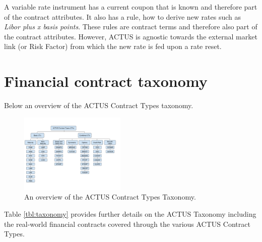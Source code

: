 \documentclass[9pt,oneside]{amsart}
\begin{document}
\begin{multicols}{2}
A variable rate instrument has a current coupon that is known and therefore part of the contract attributes. It also has a rule, how to derive new rates such as \textit{Libor plus x basis points}. These rules are contract terms and therefore also part of the contract attributes. However, ACTUS is agnostic towards the external market link (or Risk Factor) from which the new rate is fed upon a rate reset.



\section{Financial contract taxonomy}

Below an overview of the ACTUS Contract Types taxonomy.



\begin{figure}[H]
	\centering
	\includegraphics[width=0.45\textwidth]{./media/taxonomy.png}
	\caption{An overview of the ACTUS Contract Types Taxonomy.}
	\label{fig:taxonomy}
\end{figure}




Table \ref{tbl:taxonomy} provides further details on the ACTUS Taxonomy including the real-world financial contracts covered through the various ACTUS Contract Types.


\end{multicols}

\end{document}
